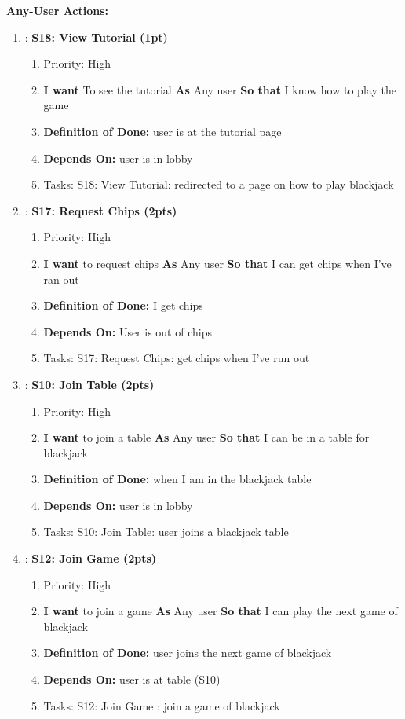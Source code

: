 \textbf{Any-User Actions:}
\begin{enumerate}
    \item: \textbf{S18: View Tutorial (1pt)}
    \begin{enumerate}
        \item Priority: High
        \item \textbf{I want} To see the tutorial \textbf{As} Any user \textbf{So that} I know how to play the game
        \item \textbf{Definition of Done:} user is at the tutorial page
        \item \textbf{Depends On:} user is in lobby
        \item Tasks: S18: View Tutorial: redirected to a page on how to play blackjack
    \end{enumerate}

    \item: \textbf{S17: Request Chips (2pts)}
    \begin{enumerate}
        \item Priority: High
        \item \textbf{I want} to request chips \textbf{As} Any user \textbf{So that} I can get chips when I've ran out 
        \item \textbf{Definition of Done:} I get chips
        \item \textbf{Depends On:} User is out of chips
        \item Tasks: S17: Request Chips: get chips when I've run out 
    \end{enumerate}
    
    \item: \textbf{S10: Join Table (2pts)}
    \begin{enumerate}
        \item Priority: High
        \item \textbf{I want} to join a table \textbf{As} Any user \textbf{So that} I can be in a table for blackjack
        \item \textbf{Definition of Done:} when I am in the blackjack table
        \item \textbf{Depends On:} user is in lobby 
        \item Tasks: S10: Join Table: user joins a blackjack table
    \end{enumerate}

    \item: \textbf{S12: Join Game (2pts)}
    \begin{enumerate}
        \item Priority: High
        \item \textbf{I want} to join a game \textbf{As} Any user \textbf{So that} I can play the next game of blackjack
        \item \textbf{Definition of Done:} user joins the next game of blackjack
        \item \textbf{Depends On:} user is at table (S10)
        \item Tasks: S12: Join Game : join a game of blackjack
    \end{enumerate}


\end{enumerate}
